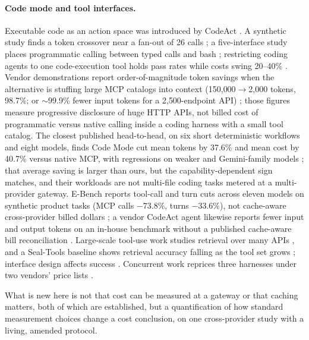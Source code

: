 \documentclass[10pt]{article}
\begin{document}
\paragraph{Code mode and tool interfaces.} Executable code as an action space was introduced by
CodeAct \citep{wang2024codeact}. A synthetic study finds a token crossover near a fan-out of 26
calls \citep{patel2026bitterlesson}; a five-interface study places programmatic calling between typed
calls and bash \citep{mak2026isbashallyouneed}; restricting coding agents to one code-execution tool
holds pass rates while costs swing 20--40\% \citep{yang2026restrictingexecutecode}. Vendor
demonstrations report order-of-magnitude token savings when the alternative is stuffing large MCP
catalogs into context (150{,}000$\to$2{,}000 tokens, 98.7\%; or $\sim$99.9\% fewer input tokens for a
2{,}500-endpoint API) \citep{anthropic2025codeexecutionmcp,cloudflare2026codemode}; those figures
measure progressive disclosure of huge HTTP APIs, not billed cost of programmatic versus native
calling inside a coding harness with a small tool catalog. The closest published head-to-head, on
six short deterministic workflows and eight models, finds Code Mode cut mean tokens by 37.6\% and
mean cost by 40.7\% versus native MCP, with regressions on weaker and Gemini-family models
\citep{mbat2026codemode}; that average saving is larger than ours, but the capability-dependent sign
matches, and their workloads are not multi-file coding tasks metered at a multi-provider gateway.
E-Bench reports tool-call and turn cuts across eleven models on synthetic product tasks (MCP calls
$-73.8\%$, turns $-33.6\%$), not cache-aware cross-provider billed dollars
\citep{zheng2026ebench}; a vendor CodeAct agent likewise reports fewer input and output tokens on an
in-house benchmark without a published cache-aware bill reconciliation
\citep{strandsagents2026codeagent}. Large-scale tool-use work studies retrieval over many APIs
\citep{qin2023toolllm}, and a Seal-Tools baseline shows retrieval accuracy falling as the tool set
grows \citep{lumer2025toolshed}; interface design affects success
\citep{yang2024sweagent,sweagentteam2025minisweagent}. Concurrent work reprices three harnesses under
two vendors' price lists \citep{liu2026harnessbuy}.

What is new here is not that cost can be measured at a gateway or that caching matters, both of
which are established, but a quantification of how standard measurement choices change a cost
conclusion, on one cross-provider study with a living, amended protocol.
\end{document}

